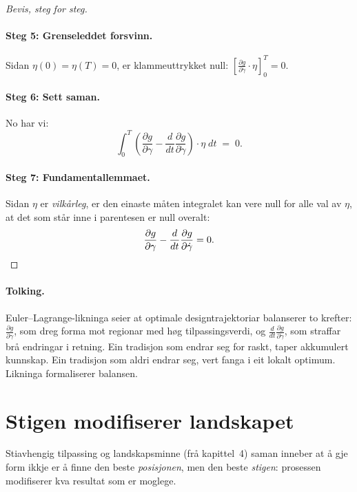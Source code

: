 \begin{proof}[Bevis, steg for steg]
\paragraph{Steg 5: Grenseleddet forsvinn.}
Sidan $\eta(0) = \eta(T) = 0$, er klammeuttrykket null:
$\left[\frac{\partial g}{\partial \dot{\gamma}} \cdot \eta
\right]_0^T = 0$.

\paragraph{Steg 6: Sett saman.}
No har vi:
\[
  \int_0^T \!\left(
    \frac{\partial g}{\partial \gamma}
    - \frac{d}{dt}\frac{\partial g}{\partial \dot{\gamma}}
  \right) \cdot \eta \; dt \;=\; 0.
\]

\paragraph{Steg 7: Fundamentallemmaet.}
Sidan $\eta$ er \emph{vilkårleg}, er den einaste måten integralet
kan vere null for alle val av $\eta$, at det som står inne i
parentesen er null overalt:
\[
  \frac{\partial g}{\partial \gamma}
  - \frac{d}{dt}\frac{\partial g}{\partial \dot{\gamma}}
  = 0. \qedhere
\]
\end{proof}

\paragraph{Tolking.}
Euler--Lagrange-likninga seier at optimale designtrajektoriar
balanserer to krefter: $\frac{\partial g}{\partial \gamma}$, som
dreg forma mot regionar med høg tilpassingsverdi, og
$\frac{d}{dt}\frac{\partial g}{\partial \dot{\gamma}}$, som
straffar brå endringar i retning. Ein tradisjon som endrar seg
for raskt, taper akkumulert kunnskap. Ein tradisjon som aldri
endrar seg, vert fanga i eit lokalt optimum. Likninga formaliserer
balansen.


\section{Stigen modifiserer landskapet}

\begin{satmark}\label{thm:L.8.3}
Stiavhengig tilpassing og landskapsminne (frå kapittel~4) saman
inneber at å gje form ikkje er å finne den beste \emph{posisjonen},
men den beste \emph{stigen}: prosessen modifiserer kva resultat
som er moglege.
\end{satmark}

